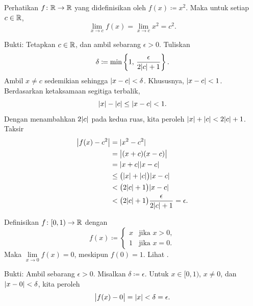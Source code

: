 \begin{example}
Perhatikan $f \colon {\mathbb{R}} \to {\mathbb{R}}$ yang didefinisikan oleh $f(x) \coloneqq x^2$.  Maka
untuk setiap $c \in {\mathbb{R}}$,
\begin{equation*}
\lim_{x\to c} f(x) = \lim_{x\to c} x^2 = c^2 .
\end{equation*}

Bukti: Tetapkan $c \in {\mathbb{R}}$, dan ambil sebarang $\epsilon > 0$.  Tuliskan
\begin{equation*}
\delta \coloneqq \min \left\{ 1 , \, \frac{\epsilon}{2\lvert {c} \rvert+1} \right\} .
\end{equation*}
Ambil $x \neq c$ sedemikian sehingga $\lvert {x-c} \rvert < \delta$.  Khususnya,
$\lvert {x-c} \rvert < 1$.  Berdasarkan ketaksamaan segitiga terbalik,
\begin{equation*}
\lvert {x} \rvert-\lvert {c} \rvert \leq \lvert {x-c} \rvert < 1 .
\end{equation*}
Dengan menambahkan $2\lvert {c} \rvert$ pada kedua ruas, kita peroleh
$\lvert {x} \rvert + \lvert {c} \rvert < 2\lvert {c} \rvert + 1$.  Taksir
\begin{equation*}
\begin{split}
\bigl\lvert {f(x) - c^2} \bigr\rvert &= \lvert {x^2-c^2} \rvert \\
&= \bigl\lvert {(x+c)(x-c)} \bigr\rvert \\
&= \lvert {x+c} \rvert\lvert {x-c} \rvert \\
&\leq \bigl(\lvert {x} \rvert+\lvert {c} \rvert\bigr)\lvert {x-c} \rvert \\
&< \bigl(2\lvert {c} \rvert+1\bigr)\lvert {x-c} \rvert \\
&< \bigl(2\lvert {c} \rvert+1\bigr)\frac{\epsilon}{2\lvert {c} \rvert+1} = \epsilon .
\end{split}
\end{equation*}
\end{example}

\begin{example}
Definisikan $f \colon [0,1) \to {\mathbb{R}}$ dengan
\begin{equation*}
f(x) \coloneqq 
\begin{cases}
x & \text{jika } x > 0 , \\
1 & \text{jika } x = 0 .
\end{cases}
\end{equation*}
Maka
$\lim\limits_{x\to 0} f(x) = 0$,
meskipun $f(0) = 1$.  Lihat .
\begin{myfigureht}
\caption{Fungsi dengan limit dan nilai yang berbeda pada $0$.\label{fig:limvaldiff}}
\end{myfigureht}

Bukti:  Ambil sebarang $\epsilon > 0$.  Misalkan $\delta \coloneqq \epsilon$.
Untuk $x \in [0,1)$, $x \neq 0$, dan $\lvert {x-0} \rvert < \delta$, kita peroleh
\begin{equation*}
\bigl\lvert {f(x) - 0} \bigr\rvert = \lvert {x} \rvert < \delta = \epsilon .
\end{equation*}
\end{example}

